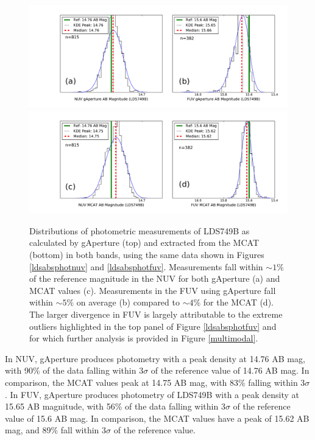 \documentclass[iop]{emulateapj}
\begin{document}
\begin{figure}[h!]
\includegraphics[scale=0.25]{Fig08a.pdf}\\
\includegraphics[scale=0.25]{Fig08b.pdf}
\caption{Distributions of photometric measurements of LDS749B as calculated by gAperture (top) and extracted from the MCAT (bottom) in both bands, using the same data shown in Figures \ref{ldsabsphotnuv} and \ref{ldsabsphotfuv}. Measurements fall within $\sim1\%$ of the reference magnitude in the NUV for both gAperture (a) and MCAT values (c). Measurements in the FUV using gAperture fall within $\sim5\%$ on average (b) compared to $\sim4\%$ for the MCAT (d). The larger divergence in FUV is largely attributable to the extreme outliers highlighted in the top panel of Figure \ref{ldsabsphotfuv} and for which further analysis is provided in Figure \ref{multimodal}.
\label{magdist}}
\end{figure}

In NUV, gAperture produces photometry with a peak density at 14.76 AB mag, with 90\% of the data falling within 3$\sigma$ of the reference value of 14.76 AB mag. In comparison, the MCAT values peak at 14.75 AB mag, with 83\% falling within 3$\sigma$. In FUV, gAperture produces photometry of LDS749B with a peak density at 15.65 AB magnitude, with 56\% of the data falling within 3$\sigma$ of the reference value of 15.6 AB mag. In comparison, the MCAT values have a peak of 15.62 AB mag, and 89\% fall within 3$\sigma$ of the reference value.
\end{document}
